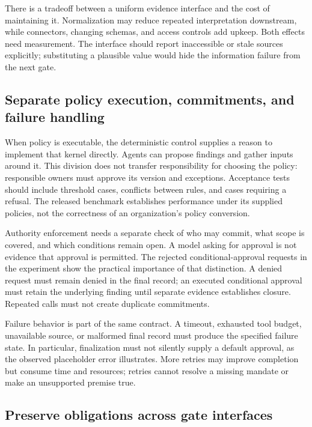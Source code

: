 There is a tradeoff between a uniform evidence interface and the cost of maintaining it.
Normalization may reduce repeated interpretation downstream, while connectors, changing
schemas, and access controls add upkeep. Both effects need measurement. The interface should
report inaccessible or stale sources explicitly; substituting a plausible value would hide
the information failure from the next gate.

\subsection{Separate policy execution, commitments, and failure handling}

When policy is executable, the deterministic control supplies a reason to implement that
kernel directly. Agents can propose findings and gather inputs around it. This division
does not transfer responsibility for choosing the policy: responsible owners must approve
its version and exceptions. Acceptance tests should include threshold cases, conflicts
between rules, and cases requiring a refusal. The released benchmark establishes performance
under its supplied policies, not the correctness of an organization's policy conversion.

Authority enforcement needs a separate check of who may commit, what scope is covered, and
which conditions remain open. A model asking for approval is not evidence that approval is
permitted. The rejected conditional-approval requests in the experiment show the practical
importance of that distinction. A denied request must remain denied in the final record;
an executed conditional approval must retain the underlying finding until separate evidence
establishes closure. Repeated calls must not create duplicate commitments.

Failure behavior is part of the same contract. A timeout, exhausted tool budget, unavailable
source, or malformed final record must produce the specified failure state. In particular,
finalization must not silently supply a default approval, as the observed placeholder error
illustrates. More retries may improve completion but consume time and resources; retries
cannot resolve a missing mandate or make an unsupported premise true.

\subsection{Preserve obligations across gate interfaces}

